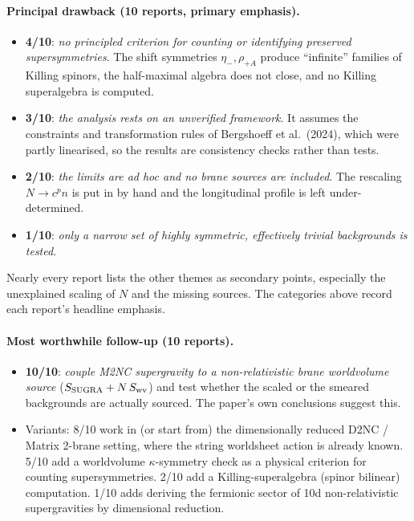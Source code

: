 \documentclass[11pt,a4paper]{article}
\begin{document}
\paragraph{Principal drawback (10 reports, primary emphasis).}
\begin{itemize}
  \item \textbf{4/10}: \emph{no principled criterion for counting or identifying preserved
  supersymmetries}. The shift symmetries $\eta_-,\rho_{+A}$ produce ``infinite'' families of
  Killing spinors, the half-maximal algebra does not close, and no Killing superalgebra is
  computed.
  \item \textbf{3/10}: \emph{the analysis rests on an unverified framework}. It assumes the
  constraints and transformation rules of Bergshoeff et al.\ (2024), which were partly
  linearised, so the results are consistency checks rather than tests.
  \item \textbf{2/10}: \emph{the limits are ad hoc and no brane sources are included}. The
  rescaling $N\to c^p n$ is put in by hand and the longitudinal profile is left
  under-determined.
  \item \textbf{1/10}: \emph{only a narrow set of highly symmetric, effectively trivial
  backgrounds is tested}.
\end{itemize}
Nearly every report lists the other themes as secondary points, especially the unexplained
scaling of $N$ and the missing sources. The categories above record each report's headline
emphasis.

\paragraph{Most worthwhile follow-up (10 reports).}
\begin{itemize}
  \item \textbf{10/10}: \emph{couple M2NC supergravity to a non-relativistic brane worldvolume
  source} ($S_{\rm SUGRA}+N\,S_{\rm wv}$) and test whether the scaled or the smeared backgrounds
  are actually sourced. The paper's own conclusions suggest this.
  \item Variants: 8/10 work in (or start from) the dimensionally reduced D2NC / Matrix 2-brane
  setting, where the string worldsheet action is already known. 5/10 add a worldvolume
  $\kappa$-symmetry check as a physical criterion for counting supersymmetries. 2/10 add a
  Killing-superalgebra (spinor bilinear) computation. 1/10 adds deriving the fermionic sector
  of 10d non-relativistic supergravities by dimensional reduction.
\end{itemize}
\end{document}
